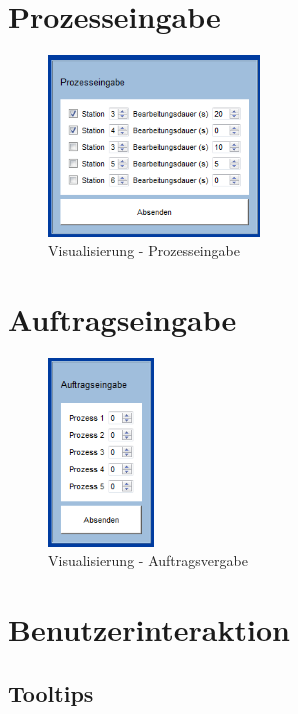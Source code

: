 \section{Prozesseingabe}
\label{sec:Prozesseingabe}

\begin{figure}[htb]
    \centering
    \includegraphics[width=0.5\textwidth]{Abbildungen/Prozesseingabe.png}
    \caption{Visualisierung - Prozesseingabe}		
    \label{fig:Prozesseingabe}
\end{figure}

\section{Auftragseingabe}
\label{sec:Auftragseingabe}

\begin{figure}[htb]
    \centering
    \includegraphics[width=0.25\textwidth]{Abbildungen/Auftragsvergabe.png}
    \caption{Visualisierung - Auftragsvergabe}		
    \label{fig:Auftragsvergabe}
\end{figure}


\section{Benutzerinteraktion}

\subsection{Tooltips}
\label{sec:tooltips}


